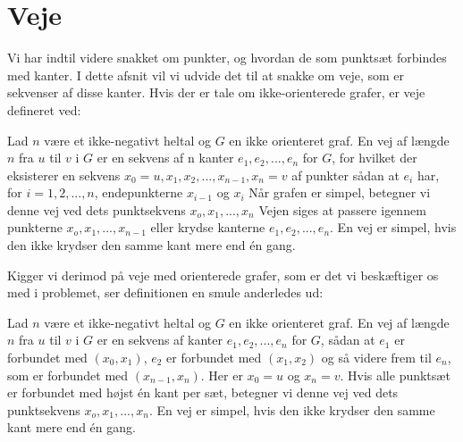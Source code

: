 \section{Veje}
Vi har indtil videre snakket om punkter, og hvordan de som punktsæt forbindes med kanter. I dette afsnit vil vi udvide det til at snakke om veje, som er sekvenser af disse kanter. Hvis der er tale om ikke-orienterede grafer, er veje defineret ved:
\begin{definition}
[Veje] 
Lad $n$ være et ikke-negativt heltal og $G$ en ikke orienteret graf. En vej af længde $n$ fra $u$ til $v$ i $G$ er en sekvens af n kanter $e_{1},e_{2},...,e_{n}$ for $G$, for hvilket der eksisterer en sekvens $x_{0}=u,x_{1},x_{2},...,x_{n-1},x_{n}=v$ af punkter sådan at $e_{i}$ har, for $i=1,2,...,n$, endepunkterne $x_{i-1}$ og $x_{i}$ Når grafen er simpel, betegner vi denne  vej ved dets punktsekvens $x_{o},x_{1},...,x_{n}$ Vejen siges at passere igennem punkterne $x_{o},x_{1},...,x_{n-1}$ eller krydse kanterne $e_{1},e_{2},...,e_{n}$. En vej er simpel, hvis den ikke krydser den samme kant mere end én gang.
\end{definition}
Kigger vi derimod på veje med orienterede grafer, som er det vi beskæftiger os med i problemet, ser definitionen en smule anderledes ud:
\begin{definition}
[Veje] 
Lad $n$ være et ikke-negativt heltal og $G$ en ikke orienteret graf. En vej af længde $n$ fra $u$ til $v$ i $G$ er en sekvens af kanter $e_{1},e_{2},...,e_{n}$ for $G$, sådan at $e_{1}$ er forbundet med $(x_{0},x_{1})$, $e_{2}$ er forbundet med $(x_{1},x_{2})$ og så videre frem til $e_{n}$, som er forbundet med $(x_{n-1},x_{n})$. Her er $x_{0}=u$ og $x_{n}=v$. Hvis alle punktsæt er forbundet med højst én kant per sæt, betegner vi denne  vej ved dets punktsekvens $x_{o},x_{1},...,x_{n}$. En vej er simpel, hvis den ikke krydser den samme kant mere end én gang.
\end{definition}




